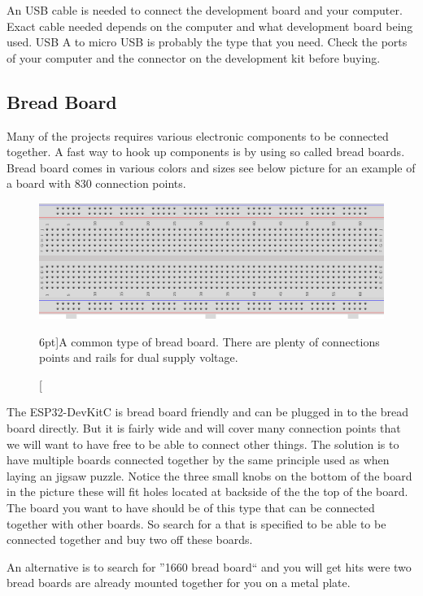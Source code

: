\documentclass{tufte-book}
\begin{document}
An USB cable is needed to connect the development board and your computer. 
Exact cable needed depends on the computer and what development board being 
used. USB A to micro USB is probably the type that you need. Check the ports of 
your computer and the connector on the development kit before buying.

\subsection{Bread Board}
Many of the projects requires various electronic components to be connected 
together. A fast way to hook up components is by using so called bread boards. 
Bread board comes in various colors and sizes see below picture for an example 
of a board with 830 connection points.

\begin{figure}
	\includegraphics{bread_board.png}
	\caption[Bread board $n$.][6pt]{A common type of bread board. There are plenty of connections points and rails for dual supply voltage.}
	\label{fig:bread_board}
\end{figure}

The ESP32-DevKitC is bread board friendly and can be plugged in to the bread 
board directly. But it is fairly wide and will cover many connection points 
that we will want to have free to be able to connect other things. 
The solution is to have multiple boards connected together by the same 
principle used as when laying an jigsaw puzzle. Notice the three small knobs on 
the bottom of the board in the picture these will fit holes located at backside 
of the the top of the board. The board you want to have should be of this type 
that can be connected together with other boards. So search for a
 that is specified to be able to be connected
together and buy two off these boards.

An alternative is to search for ''1660 bread board`` and you will get hits were 
two bread boards are already mounted together for you on a metal plate.
\end{document}
